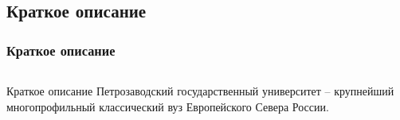 \subsection{Краткое описание}

\begin{frame}
\frametitle{Краткое описание}
  \begin{columns}[T]

    \begin{column}{.4\textwidth}
     \begin{block}{Краткое описание}
        Петрозаводский государственный университет – крупнейший многопрофильный классический вуз Европейского Севера России.
    \end{block}
    \end{column}

    
  \end{columns}
\end{frame}